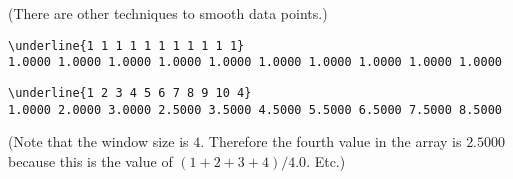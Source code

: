 (There are other techniques to smooth data points.)

\resett
\nextt
\begin{Verbatim}[frame=single, commandchars=\\\{\}]
\underline{1 1 1 1 1 1 1 1 1 1 1}
1.0000 1.0000 1.0000 1.0000 1.0000 1.0000 1.0000 1.0000 1.0000 1.0000
\end{Verbatim}

\nextt
\begin{Verbatim}[frame=single, commandchars=\\\{\}]
\underline{1 2 3 4 5 6 7 8 9 10 4}
1.0000 2.0000 3.0000 2.5000 3.5000 4.5000 5.5000 6.5000 7.5000 8.5000
\end{Verbatim}
(Note that the window size is $4$. Therefore the fourth value in the array is
$2.5000$ because this is the value of $(1+ 2 + 3 + 4) / 4.0$. Etc.)

